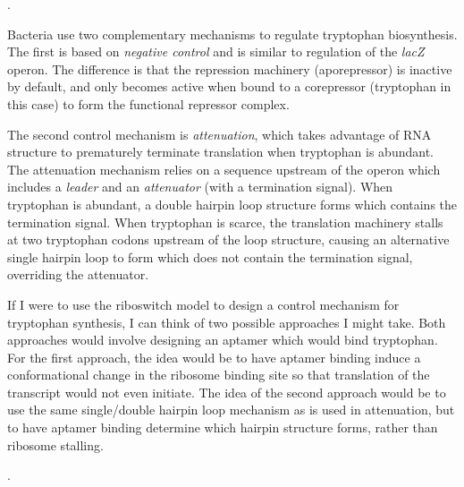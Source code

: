 \documentclass[a4paper, 10pt]{article}
\newcounter{prob_num}
\newcommand{\problem}{\vspace{20pt}\arabic{prob_num}.\stepcounter{prob_num}\par}
\begin{document}
\clearpage
\problem

Bacteria use two complementary mechanisms to regulate tryptophan biosynthesis.
The first is based on \emph{negative control} and is similar to regulation of the \emph{lacZ} operon.
The difference is that the repression machinery (aporepressor) is inactive by default, and only becomes active when bound to a corepressor (tryptophan in this case) to form the functional repressor complex.
\vspace{200px}

The second control mechanism is \emph{attenuation}, which takes advantage of RNA structure to prematurely terminate translation when tryptophan is abundant.
The attenuation mechanism relies on a sequence upstream of the operon which includes a \emph{leader} and an \emph{attenuator} (with a termination signal).
When tryptophan is abundant, a double hairpin loop structure forms which contains the termination signal.
When tryptophan is scarce, the translation machinery stalls at two tryptophan codons upstream of the loop structure, causing an alternative single hairpin loop to form which does not contain the termination signal, overriding the attenuator.
\vspace{200px}

If I were to use the riboswitch model to design a control mechanism for tryptophan synthesis, I can think of two possible approaches I might take.
Both approaches would involve designing an aptamer which would bind tryptophan.
For the first approach, the idea would be to have aptamer binding induce a conformational change in the ribosome binding site so that translation of the transcript would not even initiate.
The idea of the second approach would be to use the same single/double hairpin loop mechanism as is used in attenuation, but to have aptamer binding determine which hairpin structure forms, rather than ribosome stalling.


\clearpage
\problem
\end{document}

